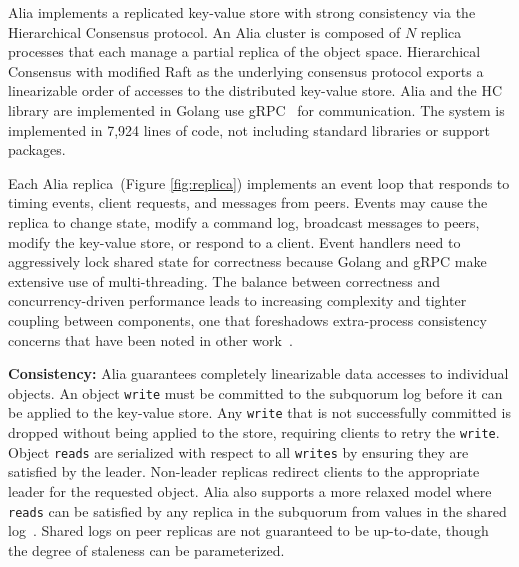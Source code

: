 \documentclass[letterpaper,10pt,twocolumn]{article}
\newcommand{\sub}{subquorum\xspace}
\newcommand{\sys}{Alia\xspace}
\newcommand{\para}[1]{\vspace{.04in}\noindent\textbf{#1}}
\begin{document}
\sys implements a replicated key-value store with strong consistency via the
Hierarchical Consensus protocol.
An \sys cluster is composed of $N$ replica processes that each manage a
partial replica of the object space.
Hierarchical Consensus with modified Raft as the underlying consensus
protocol exports a linearizable order of accesses to the distributed key-value
store.
\sys and the HC library are implemented in Golang use gRPC~\cite{grpc} for
communication.
The system is implemented in 7,924 lines of code, not including standard
libraries or support packages.

Each \sys replica~(Figure \ref{fig:replica}) implements an event loop that responds to timing events,
client requests, and messages from peers.
Events may cause the replica to change state, modify a command log, broadcast
messages to peers, modify the key-value store, or respond to a client.
Event
handlers need to aggressively lock shared state for correctness because Golang and
gRPC make extensive use of multi-threading.
The balance between correctness and concurrency-driven performance leads to
increasing complexity and tighter coupling between components, one that
foreshadows extra-process consistency concerns that have been noted in other
work~\cite{chandra_paxos_2007,raft}.

\para{Consistency:} \sys guarantees completely linearizable data accesses
to individual objects.
An object \texttt{write} must be committed to the \sub log before it can be
applied to the key-value store.
Any \texttt{write} that is not successfully committed is dropped without being
applied to the store, requiring clients to retry the \texttt{write}.
Object \texttt{reads} are serialized with respect to all \texttt{writes} by
ensuring they are satisfied by the leader.
Non-leader replicas redirect clients to the appropriate leader for the
requested object.
\sys also supports a more relaxed model where \texttt{reads} can be satisfied
by any replica in the \sub from values in the shared log~\cite{calvin}.
Shared logs on peer replicas are not guaranteed to be up-to-date, though the degree
of staleness can be parameterized.
\end{document}
